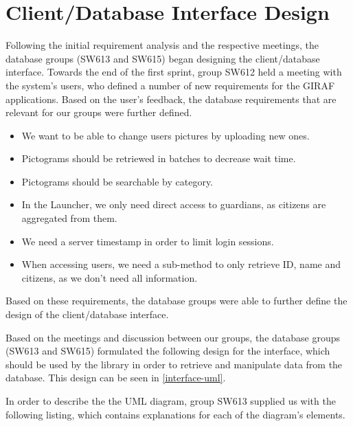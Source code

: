 \section{Client/Database Interface Design}
Following the initial requirement analysis and the respective meetings, the
database groups (SW613 and SW615) began designing the client/database interface.
Towards the end of the first sprint, group SW612 held a meeting with the
system's users, who defined a number of new requirements for the GIRAF
applications. Based on the user's feedback, the database requirements that are
relevant for our groups were further defined.

\begin{itemize}
  \item We want to be able to change users pictures by uploading new ones.
  \item Pictograms should be retriewed in batches to decrease wait time.
  \item Pictograms should be searchable by category.
  \item In the Launcher, we only need direct access to guardians, as citizens
  are aggregated from them.
  \item We need a server timestamp in order to limit login sessions.
  \item When accessing users, we need a sub-method to only retrieve ID, name and
  citizens, as we don't need all information.
\end{itemize}

Based on these requirements, the database groups were able to further define
the design of the client/database interface.\nl

Based on the meetings and discussion between our groups, the database groups
(SW613 and SW615) formulated the following design for the interface, which
should be used by the  library in order to retrieve and
manipulate data from the database. This design can be seen in
\autoref{interface-uml}.


In order to describe the the UML diagram, group SW613 supplied us with the
following listing, which contains explanations for each of the diagram's
elements.

